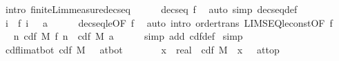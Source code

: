 \documentclass{article}
\theoremstyle{definition}
\begin{document}
\begin{isabellebody}
\ {\isacharparenleft}intro\ finite{\isacharunderscore}Lim{\isacharunderscore}measure{\isacharunderscore}decseq{\isacharparenright}\isanewline
\ \ \ \ \isamarkupfalse%
\ {\isacharbackquoteopen}decseq\ f{\isacharbackquoteclose}\ \isamarkupfalse%
\ {\isacharparenleft}auto\ simp{\isacharcolon}\ decseq{\isacharunderscore}def{\isacharparenright}\isanewline
\ \ \ \ \isamarkupfalse%
\isanewline
\ \ \isamarkupfalse%
\ \isamarkupfalse%
\ {\isachardoublequoteopen}{\isacharparenleft}{\isasymInter}i{\isachardot}\ {\isacharbraceleft}{\isachardot}{\isachardot}\ f\ i{\isacharbraceright}{\isacharparenright}\ {\isacharequal}\ {\isacharbraceleft}{\isachardot}{\isachardot}\ a{\isacharbraceright}{\isachardoublequoteclose}\isanewline
\ \ \ \ \isamarkupfalse%
\ decseq{\isacharunderscore}le{\isacharbrackleft}OF\ f{\isacharbrackright}\ \isamarkupfalse%
\ {\isacharparenleft}auto\ intro{\isacharcolon}\ order{\isacharunderscore}trans\ LIMSEQ{\isacharunderscore}le{\isacharunderscore}const{\isacharbrackleft}OF\ f{\isacharparenleft}{}{\isacharparenright}{\isacharbrackright}{\isacharparenright}\isanewline
\ \ \isamarkupfalse%
\ \isamarkupfalse%
\ {\isachardoublequoteopen}{\isacharparenleft}{\isasymlambda}n{\isachardot}\ cdf\ M\ {\isacharparenleft}f\ n{\isacharparenright}{\isacharparenright}\ {\isacharminus}{\isacharminus}{\isacharminus}{\isacharminus}{\isachargreater}\ cdf\ M\ a{\isachardoublequoteclose}\isanewline
\ \ \ \ \isamarkupfalse%
\ {\isacharparenleft}simp\ add{\isacharcolon}\ cdf{\isacharunderscore}def{\isacharparenright}\isanewline
{}\isamarkupfalse%
\ simp%
\isanewline\isanewline%
\isamarkupfalse%
\ cdf{\isacharunderscore}lim{\isacharunderscore}at{\isacharunderscore}bot{\isacharcolon}\ {\isachardoublequoteopen}{\isacharparenleft}cdf\ M\ {\isacharminus}{\isacharminus}{\isacharminus}{\isachargreater}\ {}{\isacharparenright}\ at{\isacharunderscore}bot{\isachardoublequoteclose}\isanewline
{}\isamarkupfalse%
\ {\isacharminus}\ \isanewline
\ \ \isamarkupfalse%
\ {}{\isacharcolon}\ {\isachardoublequoteopen}{\isacharparenleft}{\isacharparenleft}{\isacharpercent}x\ {\isacharcolon}{\isacharcolon}\ real{\isachardot}\ {\isacharminus}\ cdf\ M\ {\isacharparenleft}{\isacharminus}\ x{\isacharparenright}{\isacharparenright}\ {\isacharminus}{\isacharminus}{\isacharminus}{\isachargreater}\ {}{\isacharparenright}\ at{\isacharunderscore}top{\isachardoublequoteclose}\isanewline

\end{isabellebody}
\end{document}
